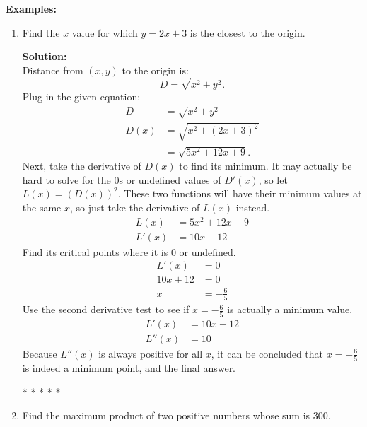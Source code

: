 \documentclass[12pt]{article}
\begin{document}
\noindent \textbf{Examples:}
\begin{enumerate}
    \item Find the $x$ value for which $y=2x+3$ is the closest to the origin.

          \noindent \textbf{Solution:}
          \\ Distance from $(x, y)$ to the origin is:
          \[ D = \sqrt{x^2 + y^2}. \]
          Plug in the given equation:
          \begin{align*}
              D    & = \sqrt{x^2 + y^2}       \\
              D(x) & = \sqrt{x^2 + (2x+3)^2}  \\
                   & = \sqrt{5x^2 + 12x + 9}.
          \end{align*}
          Next, take the derivative of $D(x)$ to find its minimum. It may actually be hard to solve for the $0$s or undefined values of $D'(x)$, so let $L(x) = \left( D(x) \right )^2$. These two functions will have their minimum values at the same $x$, so just take the derivative of $L(x)$ instead.
          \begin{align*}
              L(x)  & = 5x^2 + 12x + 9 \\
              L'(x) & = 10x + 12
          \end{align*}
          Find its critical points where it is $0$ or undefined.
          \begin{align*}
              L'(x)    & = 0            \\
              10x + 12 & = 0            \\
              x        & = -\frac{6}{5}
          \end{align*}
          Use the second derivative test to see if $x=-\frac{6}{5}$ is actually a minimum value.
          \begin{align*}
              L'(x)  & = 10x + 12 \\
              L''(x) & = 10
          \end{align*}
          Because $L''(x)$ is always positive for all $x$, it can be concluded that $x=-\frac{6}{5}$ is indeed a minimum point, and the final answer.

          \begin{center}
              * * * * *
          \end{center}

    \item Find the maximum product of two positive numbers whose sum is $300$.


\end{enumerate}
\end{document}

